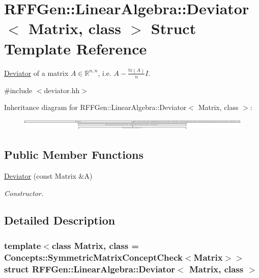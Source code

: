 \hypertarget{structRFFGen_1_1LinearAlgebra_1_1Deviator}{\section{R\-F\-F\-Gen\-:\-:Linear\-Algebra\-:\-:Deviator$<$ Matrix, class $>$ Struct Template Reference}
\label{structRFFGen_1_1LinearAlgebra_1_1Deviator}
}


\hyperlink{structRFFGen_1_1LinearAlgebra_1_1Deviator}{Deviator} of a matrix $ A\in\mathbb{R}^{n,n} $, i.\-e. $ A - \frac{\mathrm{tr}(A)}{n}I $.  




{\ttfamily \#include $<$deviator.\-hh$>$}

Inheritance diagram for R\-F\-F\-Gen\-:\-:Linear\-Algebra\-:\-:Deviator$<$ Matrix, class $>$\-:\begin{figure}[H]
\begin{center}
\leavevmode
\includegraphics[height=0.536741cm]{structRFFGen_1_1LinearAlgebra_1_1Deviator}
\end{center}
\end{figure}
\subsection*{Public Member Functions}
\begin{DoxyCompactItemize}
\item 
\hyperlink{structRFFGen_1_1LinearAlgebra_1_1Deviator_a38235925f7702700d6adcd1265b62b31}{Deviator} (const Matrix \&A)
\begin{DoxyCompactList}\small\item\em Constructor. \end{DoxyCompactList}\end{DoxyCompactItemize}


\subsection{Detailed Description}
\subsubsection*{template$<$class Matrix, class = Concepts\-::\-Symmetric\-Matrix\-Concept\-Check$<$\-Matrix$>$$>$struct R\-F\-F\-Gen\-::\-Linear\-Algebra\-::\-Deviator$<$ Matrix, class $>$}

